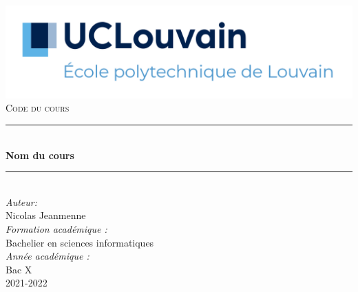 \begin{titlepage}

\newcommand{\HRule}{\rule{\linewidth}{0.5mm}} 							%
\center 
 
\includegraphics[width=\textwidth]{pictures/UCLouvain-EPL.png}\\[1cm]

\textsc{\large Code du cours}\\[1cm] 										%
\HRule \\[0.8cm]
{ \huge \bfseries Nom du cours}\\[0.7cm]								%
\HRule \\[2cm]
\large
\emph{Auteur:}\\
Nicolas Jeanmenne\\[1.5cm]													%
\emph{Formation académique :}\\
Bachelier en sciences informatiques\\[0.4cm]
\emph{Année académique :}\\
Bac X\\[5cm]
{\large 2021-2022}\\[5cm] 	%

\vfill 
\end{titlepage}